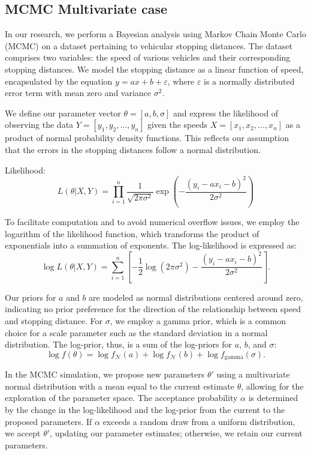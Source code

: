 \subsection*{MCMC Multivariate case}
In our research, we perform a Bayesian analysis using Markov Chain Monte Carlo (MCMC) on a dataset pertaining to vehicular stopping distances. The dataset comprises two variables: the speed of various vehicles and their corresponding stopping distances. We model the stopping distance as a linear function of speed, encapsulated by the equation \( y = ax + b + \varepsilon \), where \( \varepsilon \) is a normally distributed error term with mean zero and variance \( \sigma^2 \).

We define our parameter vector \( \theta = [a, b, \sigma] \) and express the likelihood of observing the data \( Y = [y_1, y_2, \ldots, y_n] \) given the speeds \( X = [x_1, x_2, \ldots, x_n] \) as a product of normal probability density functions. This reflects our assumption that the errors in the stopping distances follow a normal distribution.

Likelihood:
\[
L(\theta | X, Y) = \prod_{i=1}^{n} \frac{1}{\sqrt{2\pi\sigma^2}} \exp \left( -\frac{(y_i - ax_i - b)^2}{2\sigma^2} \right)
\]

To facilitate computation and to avoid numerical overflow issues, we employ the logarithm of the likelihood function, which transforms the product of exponentials into a summation of exponents. The log-likelihood is expressed as:
\[
\log L(\theta | X, Y) = \sum_{i=1}^{n} \left[ -\frac{1}{2} \log(2\pi\sigma^2) - \frac{(y_i - ax_i - b)^2}{2\sigma^2} \right].
\]

Our priors for \( a \) and \( b \) are modeled as normal distributions centered around zero, indicating no prior preference for the direction of the relationship between speed and stopping distance. For \( \sigma \), we employ a gamma prior, which is a common choice for a scale parameter such as the standard deviation in a normal distribution. The log-prior, thus, is a sum of the log-priors for \( a \), \( b \), and \( \sigma \):
\[
\log f(\theta) = \log f_{\mathcal{N}}(a) + \log f_{\mathcal{N}}(b) + \log f_{\text{gamma}}(\sigma).
\]

In the MCMC simulation, we propose new parameters \( \theta' \) using a multivariate normal distribution with a mean equal to the current estimate \( \theta \), allowing for the exploration of the parameter space. The acceptance probability \( \alpha \) is determined by the change in the log-likelihood and the log-prior from the current to the proposed parameters. If \( \alpha \) exceeds a random draw from a uniform distribution, we accept \( \theta' \), updating our parameter estimates; otherwise, we retain our current parameters.

